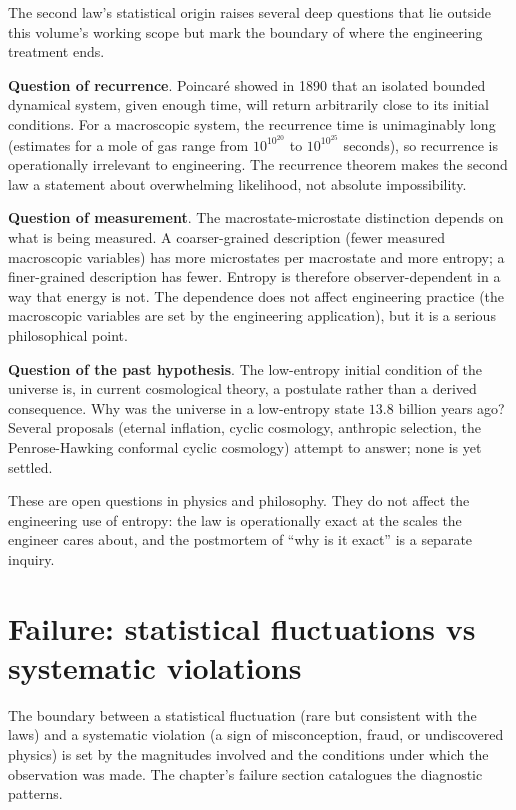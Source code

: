 \begin{mastery}
The second law's statistical origin raises several deep questions
that lie outside this volume's working scope but mark the boundary
of where the engineering treatment ends.

\textbf{Question of recurrence}. Poincar\'e showed in 1890 that an
isolated bounded dynamical system, given enough time, will return
arbitrarily close to its initial conditions. For a macroscopic
system, the recurrence time is unimaginably long (estimates for a
mole of gas range from $10^{10^{20}}$ to $10^{10^{25}}$ seconds), so
recurrence is operationally irrelevant to engineering. The recurrence
theorem makes the second law a statement about overwhelming
likelihood, not absolute impossibility.

\textbf{Question of measurement}. The macrostate-microstate
distinction depends on what is being measured. A coarser-grained
description (fewer measured macroscopic variables) has more
microstates per macrostate and more entropy; a finer-grained
description has fewer. Entropy is therefore observer-dependent in a
way that energy is not. The dependence does not affect engineering
practice (the macroscopic variables are set by the engineering
application), but it is a serious philosophical point.

\textbf{Question of the past hypothesis}. The low-entropy initial
condition of the universe is, in current cosmological theory, a
postulate rather than a derived consequence. Why was the universe in
a low-entropy state $13.8$ billion years ago? Several proposals
(eternal inflation, cyclic cosmology, anthropic selection, the
Penrose-Hawking conformal cyclic cosmology) attempt to answer; none
is yet settled.

These are open questions in physics and philosophy. They do not
affect the engineering use of entropy: the law is operationally
exact at the scales the engineer cares about, and the postmortem of
``why is it exact'' is a separate inquiry.
\end{mastery}

\section{Failure: statistical fluctuations vs systematic violations}

The boundary between a statistical fluctuation (rare but consistent
with the laws) and a systematic violation (a sign of misconception,
fraud, or undiscovered physics) is set by the magnitudes involved and
the conditions under which the observation was made. The chapter's
failure section catalogues the diagnostic patterns.


